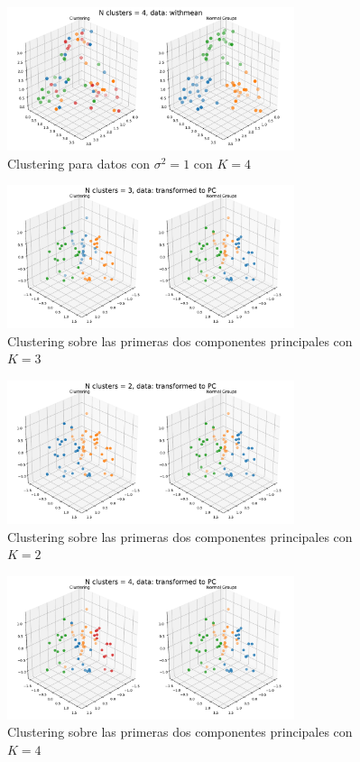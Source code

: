 \documentclass[11pt]{article}
\begin{document}
\begin{figure}[H]
    \centering
    \includegraphics[width = 0.75\textwidth]{3-withmean-4.pdf}
    \caption{Clustering para datos con $\sigma^2=1$ con $K = 4$}
    \label{3-withmean-4}
\end{figure}
\begin{figure}[H]
    \centering
    \includegraphics[width = 0.75\textwidth]{3-2pcs-3.pdf}
    \caption{Clustering sobre las primeras dos componentes principales con $K = 3$}
    \label{3-2pcs-3}
\end{figure}
\begin{figure}[H]
    \centering
    \includegraphics[width = 0.75\textwidth]{3-2pcs-2.pdf}
    \caption{Clustering sobre las primeras dos componentes principales con $K = 2$}
    \label{3-2pcs-2}
\end{figure}
\begin{figure}[H]
    \centering
    \includegraphics[width = 0.75\textwidth]{3-2pcs-4.pdf}
    \caption{Clustering sobre las primeras dos componentes principales con $K = 4$}
    \label{3-2pcs-4}
\end{figure}
\end{document}
